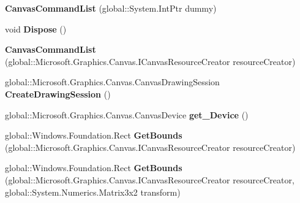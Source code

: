 \begin{DoxyCompactItemize}
\item 
\mbox{\label{class_microsoft_1_1_graphics_1_1_canvas_1_1_canvas_command_list_a56cf20ae9e747de3e640a93300982f4f}} 
{\bfseries Canvas\+Command\+List} (global\+::\+System.\+Int\+Ptr dummy)
\item 
\mbox{\label{class_microsoft_1_1_graphics_1_1_canvas_1_1_canvas_command_list_a26eecdc2e1e50ca004cd6ffbf3197786}} 
void {\bfseries Dispose} ()
\item 
\mbox{\label{class_microsoft_1_1_graphics_1_1_canvas_1_1_canvas_command_list_aa46aea923e0f8ed09d7c228ee0994a3d}} 
{\bfseries Canvas\+Command\+List} (global\+::\+Microsoft.\+Graphics.\+Canvas.\+I\+Canvas\+Resource\+Creator resource\+Creator)
\item 
\mbox{\label{class_microsoft_1_1_graphics_1_1_canvas_1_1_canvas_command_list_a4e6b387525b4db49e0c679aec814bc6d}} 
global\+::\+Microsoft.\+Graphics.\+Canvas.\+Canvas\+Drawing\+Session {\bfseries Create\+Drawing\+Session} ()
\item 
\mbox{\label{class_microsoft_1_1_graphics_1_1_canvas_1_1_canvas_command_list_afa1a1ee6bf0b44a69cd7ec45df0b6d49}} 
global\+::\+Microsoft.\+Graphics.\+Canvas.\+Canvas\+Device {\bfseries get\+\_\+\+Device} ()
\item 
\mbox{\label{class_microsoft_1_1_graphics_1_1_canvas_1_1_canvas_command_list_aca6d1c6135ba1dfb533e1ea91fc93a51}} 
global\+::\+Windows.\+Foundation.\+Rect {\bfseries Get\+Bounds} (global\+::\+Microsoft.\+Graphics.\+Canvas.\+I\+Canvas\+Resource\+Creator resource\+Creator)
\item 
\mbox{\label{class_microsoft_1_1_graphics_1_1_canvas_1_1_canvas_command_list_af2772a00b0012fc90598d8cf5789f357}} 
global\+::\+Windows.\+Foundation.\+Rect {\bfseries Get\+Bounds} (global\+::\+Microsoft.\+Graphics.\+Canvas.\+I\+Canvas\+Resource\+Creator resource\+Creator, global\+::\+System.\+Numerics.\+Matrix3x2 transform)

\end{DoxyCompactItemize}
